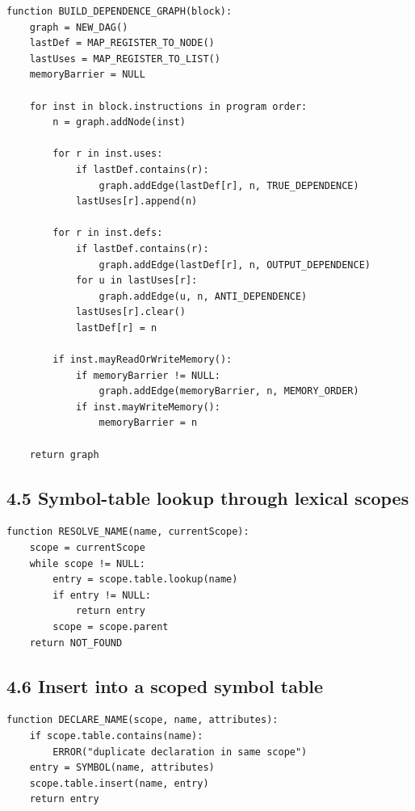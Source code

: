 \documentclass[10pt,letterpaper]{article}
\begin{document}
\begin{verbatim}
function BUILD_DEPENDENCE_GRAPH(block):
    graph = NEW_DAG()
    lastDef = MAP_REGISTER_TO_NODE()
    lastUses = MAP_REGISTER_TO_LIST()
    memoryBarrier = NULL

    for inst in block.instructions in program order:
        n = graph.addNode(inst)

        for r in inst.uses:
            if lastDef.contains(r):
                graph.addEdge(lastDef[r], n, TRUE_DEPENDENCE)
            lastUses[r].append(n)

        for r in inst.defs:
            if lastDef.contains(r):
                graph.addEdge(lastDef[r], n, OUTPUT_DEPENDENCE)
            for u in lastUses[r]:
                graph.addEdge(u, n, ANTI_DEPENDENCE)
            lastUses[r].clear()
            lastDef[r] = n

        if inst.mayReadOrWriteMemory():
            if memoryBarrier != NULL:
                graph.addEdge(memoryBarrier, n, MEMORY_ORDER)
            if inst.mayWriteMemory():
                memoryBarrier = n

    return graph
\end{verbatim}

\subsection*{4.5 Symbol-table lookup through lexical scopes}
{}

\begin{verbatim}
function RESOLVE_NAME(name, currentScope):
    scope = currentScope
    while scope != NULL:
        entry = scope.table.lookup(name)
        if entry != NULL:
            return entry
        scope = scope.parent
    return NOT_FOUND
\end{verbatim}

\subsection*{4.6 Insert into a scoped symbol table}
{}

\begin{verbatim}
function DECLARE_NAME(scope, name, attributes):
    if scope.table.contains(name):
        ERROR("duplicate declaration in same scope")
    entry = SYMBOL(name, attributes)
    scope.table.insert(name, entry)
    return entry
\end{verbatim}
\end{document}
